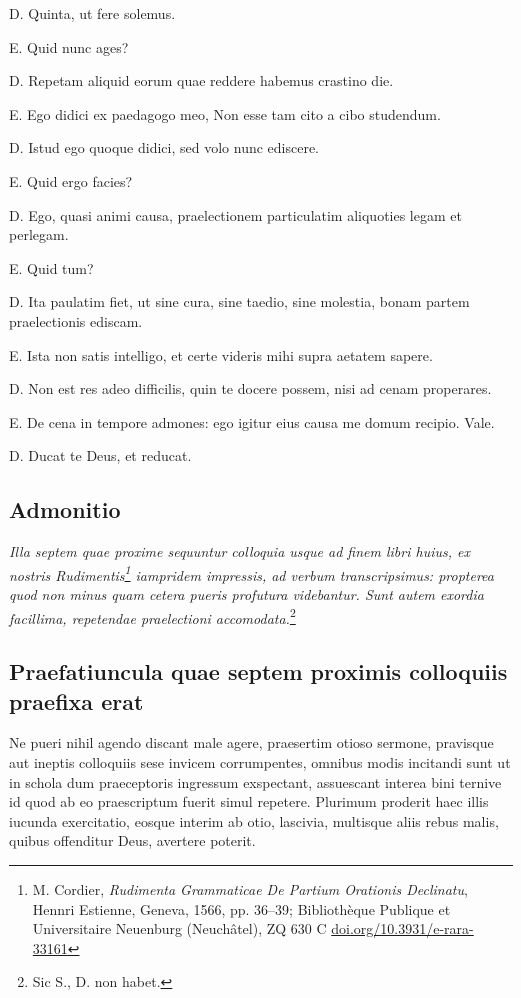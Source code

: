 \documentclass{article}
\begin{document}
D. Quinta, ut fere solemus.

E. Quid nunc ages?

D. Repetam aliquid eorum quae reddere habemus crastino die.

E. Ego didici ex paedagogo meo, Non esse tam cito a cibo studendum.

D. Istud ego quoque didici, sed volo nunc ediscere.

E. Quid ergo facies?

D. Ego, quasi animi causa, praelectionem particulatim aliquoties legam et perlegam.

E. Quid tum?

D. Ita paulatim fiet, ut sine cura, sine taedio, sine molestia, bonam partem praelectionis ediscam.

E. Ista non satis intelligo, et certe videris mihi supra aetatem sapere.

D. Non est res adeo difficilis, quin te docere possem, nisi ad cenam properares.

E. De cena in tempore admones: ego igitur eius causa me domum recipio. Vale.

D. Ducat te Deus, et reducat.

{}
\subsection*{Admonitio}
\emph{Illa septem quae proxime sequuntur colloquia usque ad finem libri huius, ex nostris \emph{Rudimentis}\footnote{M. Cordier, \emph{Rudimenta Grammaticae De Partium Orationis Declinatu}, Hennri Estienne, Geneva, 1566, pp. 36--39; Bibliothèque Publique et Universitaire Neuenburg (Neuchâtel), ZQ 630 C \url{doi.org/10.3931/e-rara-33161}} iampridem impressis, ad verbum transcripsimus: propterea quod non minus quam cetera pueris profutura videbantur. Sunt autem exordia facillima, repetendae praelectioni accomodata.}\footnote{Sic S., D. non habet.}

{}
\subsection*{Praefatiuncula quae septem proximis colloquiis praefixa erat}
Ne pueri nihil agendo discant male agere, praesertim otioso sermone, pravisque aut ineptis colloquiis sese invicem corrumpentes, omnibus modis incitandi sunt ut in schola dum praeceptoris ingressum exspectant, assuescant interea bini ternive id quod ab eo praescriptum fuerit simul repetere. Plurimum proderit haec illis iucunda exercitatio, eosque interim ab otio, lascivia, multisque aliis rebus malis, quibus offenditur Deus, avertere poterit. 
\end{document}
